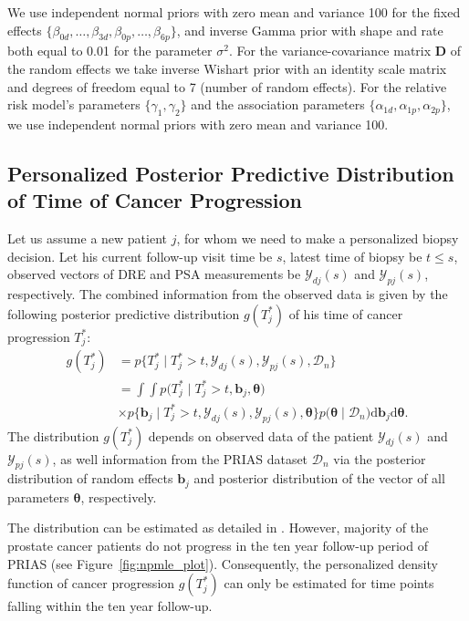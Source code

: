 We use independent normal priors with zero mean and variance 100 for the fixed effects ${\{\beta_{0d},\ldots,\beta_{3d}, \beta_{0p},\ldots,\beta_{6p}\}}$, and inverse Gamma prior with shape and rate both equal to 0.01 for the parameter $\sigma^2$. For the variance-covariance matrix $\boldsymbol{D}$ of the random effects we take inverse Wishart prior with an identity scale matrix and degrees of freedom equal to 7 (number of random effects). For the relative risk model's parameters $\{\gamma_1, \gamma_2\}$ and the association parameters $\{\alpha_{1d}, \alpha_{1p}, \alpha_{2p}\}$, we use independent normal priors with zero mean and variance 100.

\subsection{Personalized Posterior Predictive Distribution of Time of Cancer Progression}
Let us assume a new patient $j$, for whom we need to make a personalized biopsy decision. Let his current follow-up visit time be $s$, latest time of biopsy be $t\leq s$, observed vectors of DRE and PSA measurements be $\mathcal{Y}_{dj}(s)$ and $\mathcal{Y}_{pj}(s)$, respectively. The combined information from the observed data is given by the following posterior predictive distribution $g(T^*_j)$ of his time of cancer progression $T^*_j$:
\begin{equation*}
\label{eq:post_pred_dist}
\begin{aligned}
g(T^*_j) &= p\big\{T^*_j \mid T^*_j > t, \mathcal{Y}_{dj}(s), \mathcal{Y}_{pj}(s), \mathcal{D}_n\big\}\\
&= \int \int p\big(T^*_j \mid T^*_j > t, \boldsymbol{b}_j, \boldsymbol{\theta}\big)\\
&\times p\big\{\boldsymbol{b}_j \mid T^*_j>t, \mathcal{Y}_{dj}(s), \mathcal{Y}_{pj}(s), \boldsymbol{\theta}\big\}p\big(\boldsymbol{\theta} \mid \mathcal{D}_n\big) \mathrm{d} \boldsymbol{b}_j \mathrm{d} \boldsymbol{\theta}.
\end{aligned}
\end{equation*}
The distribution $g(T^*_j)$ depends on observed data of the patient $\mathcal{Y}_{dj}(s)$ and $\mathcal{Y}_{pj}(s)$, as well information from the PRIAS dataset $\mathcal{D}_n$ via the posterior distribution of random effects $\boldsymbol{b}_j$ and posterior distribution of the vector of all parameters $\boldsymbol{\theta}$, respectively.

The distribution can be estimated as detailed in \citet{landmarking2017}. However, majority of the prostate cancer patients do not progress in the ten year follow-up period of PRIAS (see Figure~\ref{fig:npmle_plot}). Consequently, the personalized density function of cancer progression $g(T^*_j)$ can only be estimated for time points falling within the ten year follow-up.

